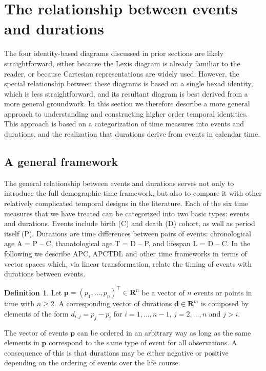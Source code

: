 \documentclass[12pt,oneside,a4paper,doublespacing]{article} %
\theoremstyle{definition}
\newtheorem{definition}{Definition}[section]
\begin{document}
\FloatBarrier

\section{The relationship between events and durations}
\label{sec:gen}
The four identity-based diagrams discussed in prior sections are likely
straightforward, either because the Lexis diagram is already
familiar to the reader, or because Cartesian representations are widely used.
However, the special relationship between these diagrams is based on a single
hexad identity, which is less straightforward, and its resultant
diagram is best derived from a more general groundwork. In this section we therefore describe a more general
approach to understanding and constructing higher order temporal identities.
This approach is based on a categorization of time measures into events and
durations, and the realization that durations derive from events in calendar
time.

\subsection{A general framework}
\label{sec:framework}

The general relationship between events and durations serves not only to
introduce the full demographic time framework, but also to compare it with
other relatively complicated temporal designs in the literature. Each of the six
time measures that we have treated can be categorized into two basic types:
events and durations. Events include birth (C) and death (D) cohort, as well as period
itself (P). Durations are time differences between pairs of events: chronological age A = P -- C, 
thanatological age T = D -- P, and lifespan L = D -- C. In the following we
describe APC, APCTDL and other time frameworks in terms of vector spaces which, via linear transformation, relate the timing of events with durations between events.

\begin{definition} 
  Let $\boldsymbol{p}=(p_1,\ldots,p_n)^\top\in\mathbf{R}^n$ be a vector of $n$
  events or points in time with $n\geq2$. A corresponding vector of durations $\boldsymbol{d}\in\mathbf{R}^m$ is composed by elements of the form $d_{i,j}=p_j-p_i$ for $i=1,\dots,n-1$, $j=2,\dots,n$ and $j>i$.
  \label{def:1}
\end{definition}

The vector of events $\boldsymbol{p}$ can be ordered in an arbitrary way as long as the same elements in $\boldsymbol{p}$ correspond to the same type of event for all observations. A consequence of this is that durations may be either
negative or positive depending on the ordering of events over the life course.
\end{document}

